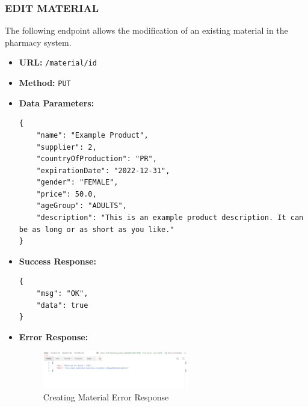 \subsubsection*{EDIT MATERIAL}
The following endpoint allows the modification of an existing material in the pharmacy system.
\begin{itemize}
    \item \textbf{URL:}
    \newline \hspace*{1cm} \texttt{/material/{id}}  
    \item \textbf{Method:}
    \newline \hspace*{1cm}\texttt{PUT}
    \item \textbf{Data Parameters:}
\begin{lstlisting}[breaklines]
{
    "name": "Example Product",
    "supplier": 2,
    "countryOfProduction": "PR",
    "expirationDate": "2022-12-31",
    "gender": "FEMALE",
    "price": 50.0,
    "ageGroup": "ADULTS",
    "description": "This is an example product description. It can be as long or as short as you like."
}

\end{lstlisting}
    \item \textbf{Success Response:}
\begin{lstlisting}[breaklines]
{
    "msg": "OK",
    "data": true
}

\end{lstlisting}
\item \textbf{Error Response:}
   
    \begin{figure}[H]
    \centering
    \includegraphics[width=0.6\textwidth]{sections/BLL/error_material.png}
    \caption{Creating Material Error Response}
    \end{figure}
   
\end{itemize}

